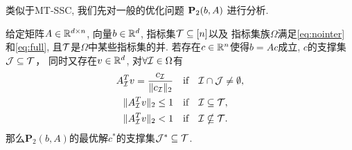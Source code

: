 类似于MT-SSC, 我们先对一般的优化问题 $\mathbf{P}_2(b,A)$ 进行分析.
\begin{lemma}\label{lem:prim_dual}
  给定矩阵$A\in\mathbb{R}^{d\times n}$, 向量$b\in \mathbb{R}^d$, 指标集$\mathcal{T}\subseteq [n]$以及
  指标集族$\Omega$满足\eqref{eq:nointer} 和\eqref{eq:full},
  且$\mathcal{T}$是$\Omega$中某些指标集的并.
  若存在$c\in \mathbb{R}^n $使得$b = Ac$成立, $c$的支撑集$\mathcal{J} \subseteq \mathcal{T}$，
  同时又存在$v\in\mathbb{R}^d$, 对$\forall \mathcal{I} \in \Omega$有
  \begin{align}
    A^T_{\mathcal{I}} v= \frac{c_{\mathcal{I}}}{\|c_{\mathcal{I}}\|_2} \quad& \text{if}\quad \mathcal{I} \cap \mathcal{J} \neq
    \emptyset,\label{eq:group_c1}\\
    \|A^T_{\mathcal{I}} v\|_2 \le  1 \quad &\text{if}\quad \mathcal{I} \subseteq \mathcal{T},\label{eq:group_c2} \\
    \|A^T_{\mathcal{I}} v\|_2< 1\quad &\text{if}\quad \mathcal{I} \nsubseteq \mathcal{T}\label{eq:group_c3}.
  \end{align}
  那么$\mathbf{P}_2(b,A)$的最优解$c^*$的支撑集$\mathcal{J}^*\subseteq \mathcal{T}$.
\end{lemma}
